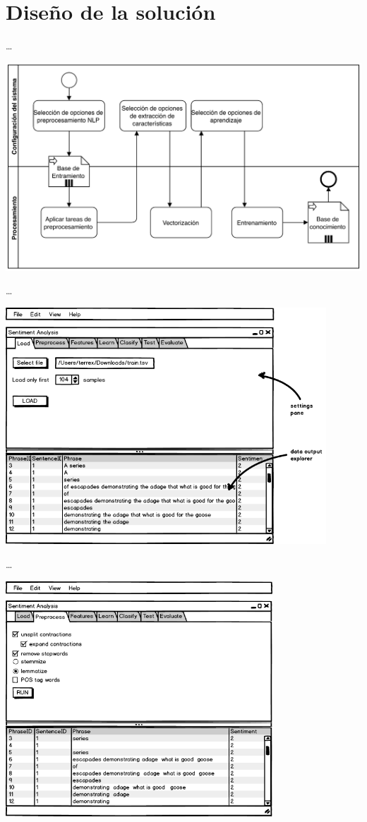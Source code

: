 
\chapter{Diseño de la solución}

\resizebox{0.5\textwidth}{!}{}

\ldots

\includegraphics[width=\textwidth]{bpmn-entrenamiento}

\ldots

\includegraphics[width=12cm]{gui-1-load}

\ldots

\includegraphics[width=10cm]{gui-2-preprocess}

